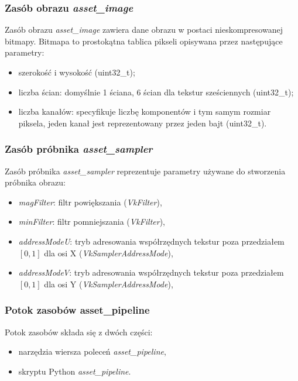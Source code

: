 \subsubsection{Zasób obrazu \textit{asset\_image}}
Zasób obrazu \textit{asset\_image} zawiera dane obrazu w postaci nieskompresowanej bitmapy.
Bitmapa to prostokątna tablica pikseli opisywana przez następujące parametry:
\begin{itemize}
	\item szerokość i wysokość (uint32\_t);
	\item liczba ścian: domyślnie 1 ściana, 6 ścian dla tekstur sześciennych (uint32\_t);
	\item liczba kanałów: specyfikuje liczbę komponentów i tym samym rozmiar piksela, jeden kanał jest reprezentowany przez jeden bajt (uint32\_t).
\end{itemize}

\subsubsection{Zasób próbnika \textit{asset\_sampler}}
Zasób próbnika \textit{asset\_sampler} reprezentuje parametry używane do stworzenia próbnika obrazu:
\begin{itemize}
	\item \textit{magFilter}: filtr powiększania (\textit{VkFilter}),
	\item \textit{minFilter}: filtr pomniejszania (\textit{VkFilter}),
	\item \textit{addressModeU}: tryb adresowania współrzędnych tekstur poza przedziałem $\left[0,1\right]$ dla osi X (\textit{VkSamplerAddressMode}),
	\item \textit{addressModeV}: tryb adresowania współrzędnych tekstur poza przedziałem $\left[0,1\right]$ dla osi Y (\textit{VkSamplerAddressMode}),
\end{itemize}

\subsubsection{Potok zasobów asset\_pipeline}
Potok zasobów składa się z dwóch części:
\begin{itemize}
	\item narzędzia wiersza poleceń \textit{asset\_pipeline},
	\item skryptu Python \textit{asset\_pipeline}.
\end{itemize}

